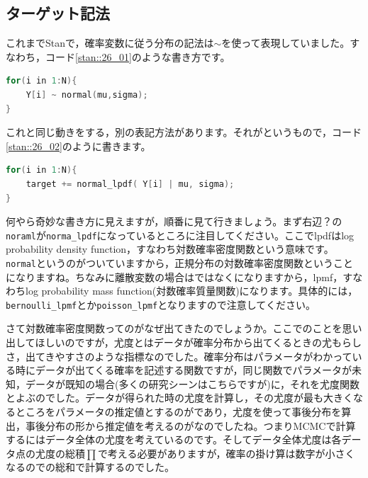 \documentclass{ltjsbook}
\begin{document}
\subsection{ターゲット記法}
これまでStanで，確率変数に従う分布の記法は$\sim$を使って表現していました。すなわち，コード\ref{stan::26_01}のような書き方です。
\begin{lstlisting}[language=C++,label={stan::26_01},caption={sampling記法}]
for(i in 1:N){
    Y[i] ~ normal(mu,sigma);
}
\end{lstlisting}
これと同じ動きをする，別の表記方法があります。それがというもので，コード\ref{stan::26_02}のように書きます。
\begin{lstlisting}[language=C++,label={stan::26_02},caption={target記法}]
for(i in 1:N){
    target += normal_lpdf( Y[i] | mu, sigma);
}
\end{lstlisting}

何やら奇妙な書き方に見えますが，順番に見て行きましょう。まず右辺？の\verb|noraml|が\verb|norma_lpdf|になっているところに注目してください。ここでlpdfはlog probability density function，すなわち対数確率密度関数という意味です。\verb|normal|というのがついていますから，正規分布の対数確率密度関数ということになりますね。ちなみに離散変数の場合はではなくになりますから，lpmf，すなわちlog probability mass function(対数確率質量関数)になります。具体的には，\verb|bernoulli_lpmf|とか\verb|poisson_lpmf|となりますので注意してください。

さて対数確率密度関数ってのがなぜ出てきたのでしょうか。ここでのことを思い出してほしいのですが，尤度とはデータが確率分布から出てくるときの尤もらしさ，出てきやすさのような指標なのでした。確率分布はパラメータがわかっている時にデータが出てくる確率を記述する関数ですが，同じ関数でパラメータが未知，データが既知の場合(多くの研究シーンはこちらですが)に，それを尤度関数とよぶのでした。データが得られた時の尤度を計算し，その尤度が最も大きくなるところをパラメータの推定値とするのがであり，尤度を使って事後分布を算出，事後分布の形から推定値を考えるのがなのでしたね。つまりMCMCで計算するにはデータ全体の尤度を考えているのです。そしてデータ全体尤度は各データ点の尤度の総積$\prod$で考える必要がありますが，確率の掛け算は数字が小さくなるのでの総和で計算するのでした。
\end{document}
